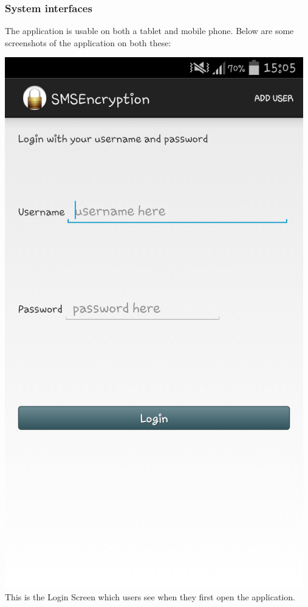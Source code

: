 \subsubsection{System interfaces}
The application is usable on both a tablet and mobile phone. Below are some screenshots of the application on both these:\\
\begin{center}
 \includegraphics[width=13cm]{screenshots/normal/1_LoginScreen.png}
 This is the Login Screen which users see when they first open the application.
\end{center}

